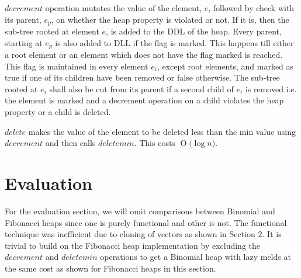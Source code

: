 \documentclass{llncs}
\newcommand{\BigO}[1]{\ensuremath{\operatorname{O}\bigl(#1\bigr)}}
\begin{document}
$decrement$ operation mutates the value of the element, $e$, followed by check with its parent, $e_p$, on whether the heap property is violated or not. If it is, then the sub-tree rooted at element $e$, is added to the DDL of the heap. Every parent, starting at $e_p$ is also added to DLL if the flag is marked. This happens till either a root element or an element which does not have the flag marked is reached. This flag is maintained in every element $e_i$, except root elements, and marked as true if one of its children have been removed or false otherwise. The sub-tree rooted at $e_i$ shall also be cut from its parent if a second child of $e_i$ is removed i.e. the element is marked and a decrement operation on a child violates the heap property or a child is deleted.

$delete$ makes the value of the element to be deleted less than the min value using $decrement$ and then calls $deletemin$. This costs \BigO{\log n}.


\section{Evaluation}
For the evaluation section, we will omit comparisons between Binomial and Fibonacci heaps since one is purely functional and other is not. The functional technique was inefficient due to cloning of vectors as shown in Section $2$. It is trivial to build on the Fibonacci heap implementation by excluding the $decrement$ and $deletemin$ operations to get a Binomial heap with lazy melds\cite{kozen1992design} at the same cost as shown for Fibonacci heaps in this section.
\end{document}
